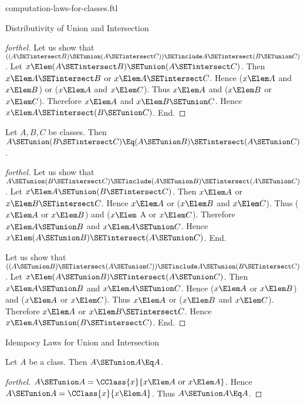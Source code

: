 \documentclass{stex}
\begin{document}
\begin{smodule}{computation-laws-for-classes.ftl}
\begin{sfragment}{Distributivity of Union and Intersection}
\begin{proof}[forthel]
    Let us show that $((A \SETintersect B) \SETunion (A \SETintersect C)) \SETinclude A \SETintersect (B \SETunion C)$. %
      Let $x \Elem (A \SETintersect B) \SETunion (A \SETintersect C)$.
      Then $x \Elem A \SETintersect B$ or $x \Elem A \SETintersect C$.
      Hence ($x \Elem A$ and $x \Elem B$) or ($x \Elem A$ and $x \Elem C$).
      Thus $x \Elem A$ and ($x \Elem B$ or $x \Elem C$).
      Therefore $x \Elem A$ and $x \Elem B \SETunion C$.
      Hence$ x \Elem A \SETintersect (B \SETunion C)$.
    End.
  \end{proof}

  \begin{proposition}[forthel]
    Let $A, B, C$ be classes.
    Then $A \SETunion (B \SETintersect C) \Eq (A \SETunion B) \SETintersect (A \SETunion C)$.
  \end{proposition}
  \begin{proof}[forthel]
    Let us show that $A \SETunion (B \SETintersect C) \SETinclude (A \SETunion B) \SETintersect (A \SETunion C)$.
      Let $x \Elem A \SETunion (B \SETintersect C)$.
      Then $x \Elem A$ or $x \Elem B \SETintersect C$.
      Hence $x \Elem A$ or ($x \Elem B$ and $x \Elem C$).
      Thus ($x \Elem A$ or $x \Elem B$) and ($x \Elem$ A or $x \Elem C$).
      Therefore $x \Elem A \SETunion B$ and $x \Elem A \SETunion C$.
      Hence $x \Elem (A \SETunion B) \SETintersect (A \SETunion C)$.
    End.

    Let us show that $((A \SETunion B) \SETintersect (A \SETunion C)) \SETinclude A \SETunion (B \SETintersect C)$. %
      Let $x \Elem (A \SETunion B) \SETintersect (A \SETunion C)$.
      Then $x \Elem A \SETunion B$ and $x \Elem A \SETunion C$.
      Hence ($x \Elem A$ or $x \Elem B$) and ($x \Elem A$ or $x \Elem C$).
      Thus $x \Elem A$ or ($x \Elem B$ and $x \Elem C$).
      Therefore $x \Elem A$ or $x \Elem B \SETintersect C$.
      Hence $x \Elem A \SETunion (B \SETintersect C)$.
    End.
  \end{proof}
\end{sfragment}

\begin{sfragment}{Idempocy Laws for Union and Intersection}
  \begin{proposition}[forthel]
    Let $A$ be a class.
    Then $A \SETunion A \Eq A$.
  \end{proposition}
  \begin{proof}[forthel]
    $A \SETunion A = \CClass{x}{x \Elem A\text{ or }x \Elem A}$.
    Hence $A \SETunion A = \CClass{x}{x \Elem A}$.
    Thus $A \SETunion A \Eq A$.
  \end{proof}


\end{sfragment}
\end{smodule}
\end{document}
